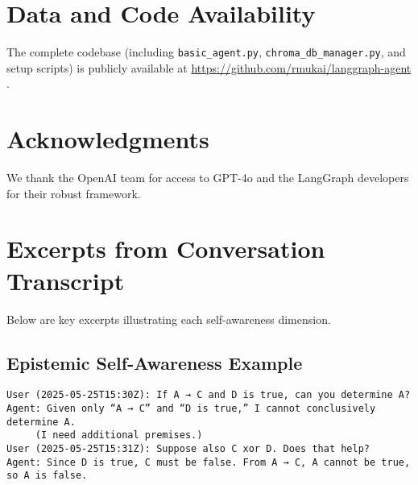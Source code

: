 \documentclass[11pt]{article}
\begin{document}
\section*{Data and Code Availability}
The complete codebase (including \texttt{basic\_agent.py}, \texttt{chroma\_db\_manager.py}, and setup scripts) is publicly available at \url{https://github.com/rmukai/langgraph-agent} \cite{LangGraphAgent2025}.


\section*{Acknowledgments}
We thank the OpenAI team for  access to GPT-4o and the LangGraph developers for their robust framework.

\appendix
\section{Excerpts from Conversation Transcript}
Below are key excerpts illustrating each self-awareness dimension.

\subsection{Epistemic Self-Awareness Example}
\begin{verbatim}
User (2025-05-25T15:30Z): If A → C and D is true, can you determine A?
Agent: Given only “A → C” and “D is true,” I cannot conclusively determine A.
     (I need additional premises.)
User (2025-05-25T15:31Z): Suppose also C xor D. Does that help?
Agent: Since D is true, C must be false. From A → C, A cannot be true, so A is false.
\end{verbatim}
\end{document}
